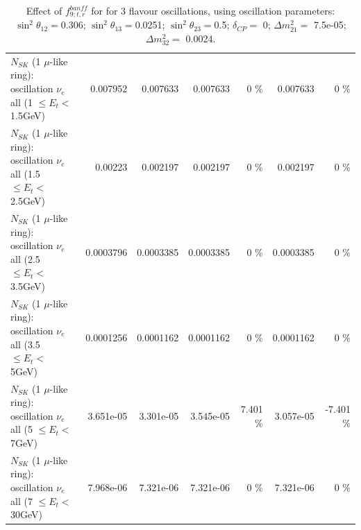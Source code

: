 \begin{table}
\begin{tabular}{| l | r | r | r  r | r  r |}
$N_{SK}$ (1 $\mu$-like ring): oscillation $\nu_{e}$ all (1 $\leq E_{t} <$ 1.5GeV) &        0.007952 &        0.007633 &        0.007633 &        0 \%  &        0.007633 &        0 \%  \\ 
$N_{SK}$ (1 $\mu$-like ring): oscillation $\nu_{e}$ all (1.5 $\leq E_{t} <$ 2.5GeV) &         0.00223 &        0.002197 &        0.002197 &        0 \%  &        0.002197 &        0 \%  \\ 
$N_{SK}$ (1 $\mu$-like ring): oscillation $\nu_{e}$ all (2.5 $\leq E_{t} <$ 3.5GeV) &       0.0003796 &       0.0003385 &       0.0003385 &        0 \%  &       0.0003385 &        0 \%  \\ 
$N_{SK}$ (1 $\mu$-like ring): oscillation $\nu_{e}$ all (3.5 $\leq E_{t} <$ 5GeV) &       0.0001256 &       0.0001162 &       0.0001162 &        0 \%  &       0.0001162 &        0 \%  \\ 
 $N_{SK}$ (1 $\mu$-like ring): oscillation $\nu_{e}$ all (5 $\leq E_{t} <$ 7GeV) &       3.651e-05 &       3.301e-05 &       3.545e-05 &    7.401 \%  &       3.057e-05 &   -7.401 \%  \\ 
$N_{SK}$ (1 $\mu$-like ring): oscillation $\nu_{e}$ all (7 $\leq E_{t} <$ 30GeV) &       7.968e-06 &       7.321e-06 &       7.321e-06 &        0 \%  &       7.321e-06 &        0 \%  \\ 
\hline
\hline
\end{tabular}
\caption{ Effect of $f_{9; t, r}^{banff}$ for for 3 flavour oscillations, using oscillation parameters:  $\sin^2\theta_{12} = $0.306; $\sin^2\theta_{13} = $0.0251; $\sin^2\theta_{23} = $0.5; $\delta_{CP} = $        0; $\Delta m^2_{21} = $    7.5e-05; $\Delta m^2_{32} = $    0.0024. }
\label{tab:num_banff_09_1RmuT_3f_osc_t13:0.0251}
\end{table}
\clearpage
